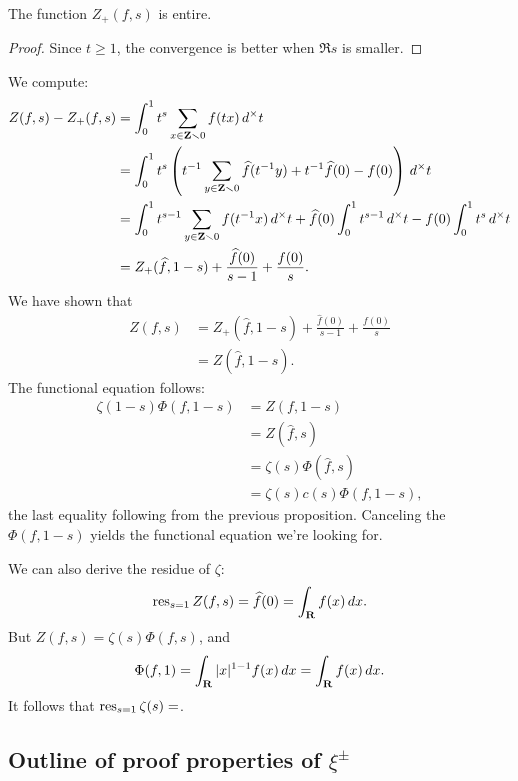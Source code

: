 \begin{lemm}
The function $Z_+(f,s)$ is entire. 
\end{lemm}
\begin{proof}
Since $t\geqslant 1$, the convergence is better when $\Re s$ is smaller. 
\end{proof}

We compute: 
\begin{align*}
  Z(f,s) - Z_+(f,s) 
    &= \int_0^1 t^s \sum_{x\in \mathbf{Z}\smallsetminus 0} f(t x)\, d^\times t \\
    &= \int_0^1 t^s \left(t^{-1} \sum_{y\in \mathbf{Z}\smallsetminus 0} \widehat f(t^{-1} y) + t^{-1} \widehat f(0) - f(0)\right)\, d^\times t \\
    &= \int_0^1 t^{s-1} \sum_{y\in \mathbf{Z}\smallsetminus 0} f(t^{-1} x)\, d^\times t + \widehat f(0) \int_0^1 t^{s-1} \, d^\times t - f(0) \int_0^1 t^s \, d^\times t \\
    &= Z_+(\widehat f,1-s) + \frac{\widehat f(0)}{s-1} + \frac{f(0)}{s} .
\end{align*}
We have shown that 
\begin{align*}
  Z(f,s) 
    &= Z_+(\widehat f,1-s) + \frac{\widehat f(0)}{s-1} + \frac{f(0)}{s} \\
    &= Z(\widehat f,1-s) .
\end{align*}
The functional equation follows: 
\begin{align*}
  \zeta(1-s) \Phi(f,1-s) 
    &= Z(f,1-s) \\
    &= Z(\widehat f,s) \\
    &= \zeta(s) \Phi(\widehat f,s) \\
    &= \zeta(s) c(s)\Phi(f,1-s) ,
\end{align*}
the last equality following from the previous proposition. Canceling the 
$\Phi(f,1-s)$ yields the functional equation we're looking for. 

We can also derive the residue of $\zeta$: 
\[
  \operatorname{res}_{s=1} Z(f,s) 
    = \widehat f(0) 
    = \int_{\mathbf{R}} f(x)\, dx .
\]
But $Z(f,s) = \zeta(s) \Phi(f,s)$, and 
\[
  \Phi(f,1) = \int_{\mathbf{R}} |x|^{1-1} f(x)\, dx = \int_{\mathbf{R}} f(x)\, dx .
\]
It follows that $\operatorname{res}_{s=1} \zeta(s) = $. 





\subsection{Outline of proof properties of \texorpdfstring{$\xi^\pm$}{xi}}


